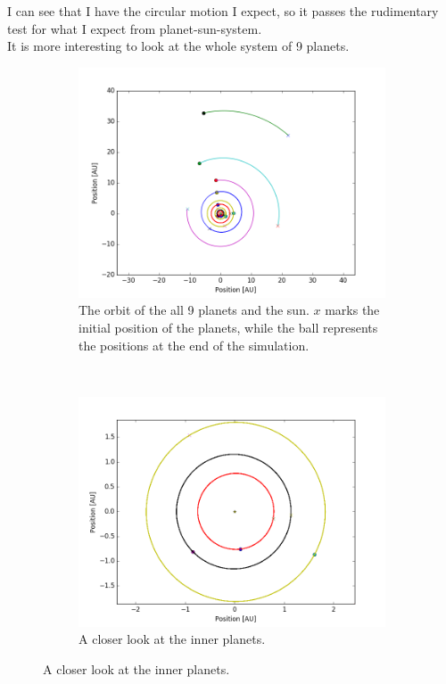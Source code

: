 \documentclass[a4paper, 10pt]{article}
\begin{document}
I can see that I have the circular motion I expect, so it passes the rudimentary test for what I expect from planet-sun-system. \\ 

It is more interesting to look at the whole system of 9 planets.

\begin{figure}[H]
\centering
\begin{subfigure}[t]{0.5\textwidth}
\centering
\includegraphics[width=\textwidth]{part2fullSystem.png}
\caption{The orbit of the all 9 planets and the sun. $x$ marks the initial position of the planets, while the ball represents the positions at the end of the simulation.}
\end{subfigure}%
~
\begin{subfigure}[t]{0.5\textwidth}
\centering
\includegraphics[width=\textwidth]{part2innerPlanets.png}
\caption{A closer look at the inner planets.}
\end{subfigure}%
\end{figure}
\end{document}
